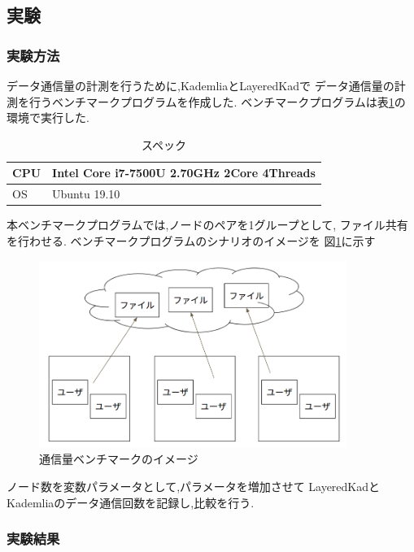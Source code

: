 \documentclass[sotsuron]{jcsie}
\begin{document}
\subsection{実験}
\subsubsection{実験方法}
データ通信量の計測を行うために,KademliaとLayeredKadで
データ通信量の計測を行うベンチマークプログラムを作成した.
ベンチマークプログラムは表\ref{table:spec-note}の環境で実行した.

\begin{table}[H]
	\caption{スペック}	
	\centering
	\label{table:spec-note}
	\begin{tabular}{|l|l|}
		\hline
		CPU &   
		Intel Core i7-7500U 2.70GHz 2Core 4Threads\\ 
		\hline	
		OS  &   
		Ubuntu 19.10 \\ 
		\hline
	\end{tabular}	
\end{table}

本ベンチマークプログラムでは,ノードのペアを1グループとして,
ファイル共有を行わせる.
ベンチマークプログラムのシナリオのイメージを
図\ref{fig:trafficBenchmark}に示す

\begin{figure}[H]
	\centering
	\includegraphics[width=10cm]{./assets/image/traffic_benchmark.png}
	\caption{通信量ベンチマークのイメージ}
	\label{fig:trafficBenchmark}
\end{figure}

ノード数を変数パラメータとして,パラメータを増加させて
LayeredKadとKademliaのデータ通信回数を記録し,比較を行う.

\subsubsection{実験結果}
\end{document}
